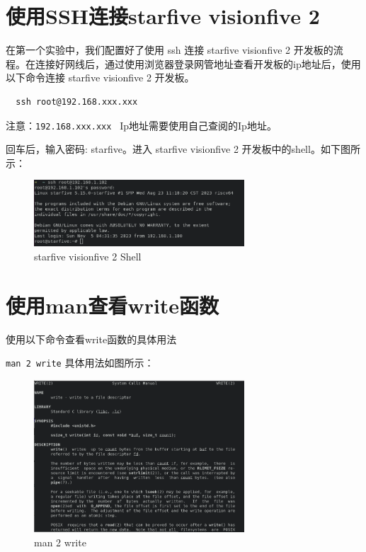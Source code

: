 \documentclass[lang=cn,10pt]{elegantbook}
\begin{document}
\section{使用SSH连接starfive visionfive 2}
在第一个实验中，我们配置好了使用 ssh 连接 starfive visionfive 2 开发板的流程。在连接好网线后，通过使用浏览器登录网管地址查看开发板的ip地址后，使用以下命令连接 starfive visionfive 2 开发板。

\begin{lstlisting}
  ssh root@192.168.xxx.xxx
\end{lstlisting}

注意：\lstinline{192.168.xxx.xxx } Ip地址需要使用自己查阅的Ip地址。

回车后，输入密码: starfive。进入 starfive visionfive 2 开发板中的shell。如下图所示：

\begin{figure}[htbp]
  \centering
  \includegraphics[width=0.7\textwidth]{image/image-20231105133005556.png}
  \caption{ starfive visionfive 2 Shell}
\end{figure}

\section{使用man查看write函数}
使用以下命令查看write函数的具体用法

\lstinline{man 2 write}
具体用法如图所示：
\begin{figure}[htbp]
  \centering
  \includegraphics[width=0.7\textwidth]{image/image-20231105133327813.png}
  \caption{man 2 write}
\end{figure}
\end{document}
